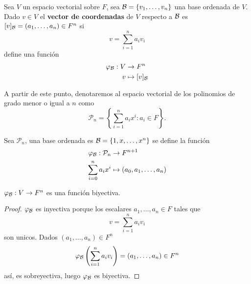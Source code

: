 \documentclass[12pt,a4paper]{book}
\newcommand{\parentesis}[1]{\left(#1\right)}
\newcommand{\llavesgrandes}[1]{\left\{#1\right\}}
\begin{document}
    \begin{definicion}
        Sea $V$ un espacio vectorial sobre $F$, sea $\mathcal{B}=\{v_{1},\dots,v_{n}\}$ una base ordenada
        de $V$. Dado $v\in V$ el \textbf{vector de coordenadas} de $V$ respecto a $\mathcal{B}$ es
        $[v]_{\mathcal{B}}=(a_{1},\dots,a_{n})\in F^{n}$ si
        \begin{equation*}
            v=\sum_{i=1}^{n}a_{i}v_{i}
        \end{equation*}
        define una función
        \begin{align*}
            \varphi_{\mathcal{B}}:V&\to F^{n}\\
            v&\mapsto[v]_{\mathcal{B}}
        \end{align*}
    \end{definicion}

    A partir de este punto, denotaremos al espacio vectorial de los polinomios de grado menor o igual a $n$ como
    \[
    \mathcal{P}_n = \llavesgrandes{\sum_{i = 1}^n a_ix^{i} : a_i \in F}.
    \]
    
    \begin{ejemplo}
        Sea $\mathcal{P}_{n}$, una base ordenada es $\mathcal{B}=\{1,x,\dots,x^{n}\}$ se define la función
        \begin{align*}
            \varphi_{\mathcal{B}}:\mathcal{P}_{n}&\to F^{n+1}\\
            \sum^{n}_{i=0}a_{i}x^{i}&\mapsto(a_{0},a_{1},\dots,a_{n})
        \end{align*}
    \end{ejemplo}

    \begin{proposicion}
        $\varphi_{\mathcal{B}}:V\to F^{n}$ es una función biyectiva.
    \end{proposicion}

    \begin{proof}
        $\varphi_{\mathcal{B}}$ es inyectiva porque los escalares $a_{1},\dots,a_{n}\in F$ tales que
        \begin{equation*}
            v=\sum_{i=1}^{n}a_{i}v_{i}
        \end{equation*}
        son unicos. Dados $(a_{1},\dots,a_{n})\in F^{n}$
        \begin{equation*}
            \varphi_{\BB}\parentesis{\sum_{i=1}^{n}a_{i}v_{i}}=(a_{1},\dots,a_{n})\in F^{n}
        \end{equation*}
        así, es sobreyectiva, luego $\varphi_{\mathcal{B}}$ es biyectiva.
    \end{proof}
\end{document}
